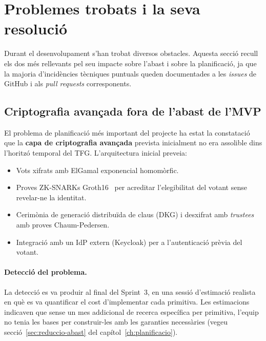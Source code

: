 

\section{Problemes trobats i la seva resolució}
\label{sec:problemes}

Durant el desenvolupament s'han trobat diversos obstacles.
Aquesta secció recull els dos més rellevants pel seu impacte sobre l'abast i sobre la planificació, ja que la majoria
d'incidències tècniques puntuals queden documentades a les \emph{issues} de GitHub i als \emph{pull requests}
corresponents.

\subsection{Criptografia avançada fora de l'abast de l'MVP}
\label{subsec:criptografia-fora}

El problema de planificació més important del projecte ha estat la constatació que la \textbf{capa de criptografia
avançada} prevista inicialment no era assolible dins l'horitzó temporal del \ac{TFG}.
L'arquitectura inicial preveia:

\begin{itemize}
    \item Vots xifrats amb ElGamal exponencial homomòrfic.

    \item Proves \acsp{ZK-SNARK} Groth16~\cite{cortier2019belenios,adida2008helios} per acreditar l'elegibilitat del
    votant sense revelar-ne la identitat.

    \item Cerimònia de generació distribuïda de claus (DKG) i desxifrat amb \emph{trustees} amb proves Chaum-Pedersen.

    \item Integració amb un \ac{IdP} extern (Keycloak) per a l'autenticació prèvia del votant.
\end{itemize}

\paragraph{Detecció del problema.} La detecció es va produir al final
del Sprint~3, en una sessió d'estimació realista en què es va quantificar el cost d'implementar cada primitiva.
Les estimacions indicaven que sense un mes addicional de recerca específica per primitiva, l'equip no tenia les bases
per construir-les amb les garanties necessàries (vegeu secció~\ref{sec:reduccio-abast} del
capítol~\ref{ch:planificacio}).

